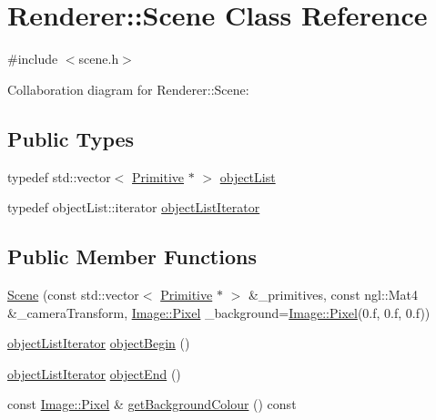 \hypertarget{classRenderer_1_1Scene}{}\section{Renderer\+:\+:Scene Class Reference}
\label{classRenderer_1_1Scene}


{\ttfamily \#include $<$scene.\+h$>$}



Collaboration diagram for Renderer\+:\+:Scene\+:
\subsection*{Public Types}
\begin{DoxyCompactItemize}
\item 
typedef std\+::vector$<$ \hyperlink{classRenderer_1_1Primitive}{Primitive} $\ast$ $>$ \hyperlink{classRenderer_1_1Scene_a883277f707aee77273e5e8ce210c8673}{object\+List}
\item 
typedef object\+List\+::iterator \hyperlink{classRenderer_1_1Scene_a6408d8af3659e808e45877a96a6059de}{object\+List\+Iterator}
\end{DoxyCompactItemize}
\subsection*{Public Member Functions}
\begin{DoxyCompactItemize}
\item 
\hyperlink{classRenderer_1_1Scene_a42cd9d1821ccd82a487e112f4bc3a9db}{Scene} (const std\+::vector$<$ \hyperlink{classRenderer_1_1Primitive}{Primitive} $\ast$ $>$ \&\+\_\+primitives, const ngl\+::\+Mat4 \&\+\_\+camera\+Transform, \hyperlink{structImage_1_1Pixel}{Image\+::\+Pixel} \+\_\+background=\hyperlink{structImage_1_1Pixel}{Image\+::\+Pixel}(0.f, 0.f, 0.f))
\item 
\hyperlink{classRenderer_1_1Scene_a6408d8af3659e808e45877a96a6059de}{object\+List\+Iterator} \hyperlink{classRenderer_1_1Scene_ac71ec50dfcae221f69e83ac1717b865d}{object\+Begin} ()
\item 
\hyperlink{classRenderer_1_1Scene_a6408d8af3659e808e45877a96a6059de}{object\+List\+Iterator} \hyperlink{classRenderer_1_1Scene_af5f44baafb6e49510712579c4aca0ca7}{object\+End} ()
\item 
const \hyperlink{structImage_1_1Pixel}{Image\+::\+Pixel} \& \hyperlink{classRenderer_1_1Scene_afed66d5469d6bf5c15a8a1c72051a45a}{get\+Background\+Colour} () const 
\end{DoxyCompactItemize}


